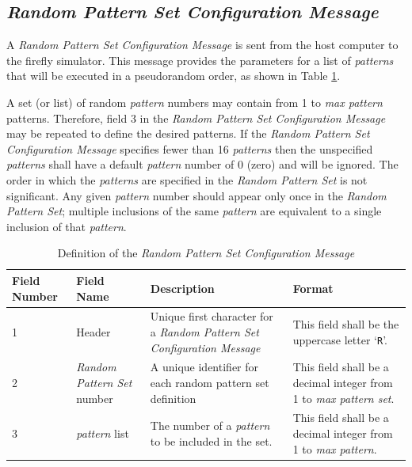 \documentclass[letterpaper,11pt]{article}
\begin{document}
\subsection{\textit{Random Pattern Set Configuration Message}}

A \textit{Random Pattern Set Configuration Message} is sent from the host
computer to the firefly simulator. This message provides the parameters for
a list of \textit{patterns} that will be executed in a pseudorandom order,
as shown in Table \ref{tab:PatternSetConfig}.

A set (or list) of random \textit{pattern} numbers may contain from 1 to
\textit{max pattern} patterns.
Therefore, field 3 in the \textit{Random Pattern Set Configuration Message} may
be repeated to define the desired patterns. If the \textit{Random Pattern Set
Configuration Message} specifies fewer than 16 \textit{patterns} then the
unspecified \textit{patterns} shall have a default \textit{pattern} number of
0 (zero) and will be ignored. The order in which the \textit{patterns} are
specified in the \textit{Random Pattern Set} is not significant. Any given
\textit{pattern} number should appear only once in the \textit{Random Pattern
Set}; multiple inclusions of the same \textit{pattern} are equivalent to a
single inclusion of that \textit{pattern}.

\begin{table}[H]
\centering
\caption{Definition of the \textit{Random Pattern Set Configuration Message}}
\label{tab:PatternSetConfig}
\setlength\extrarowheight{2pt}
\begin{tabular}[h]{|p{0.5in}|p{1.00in}|p{2.25in}|p{2.25in}|} \hline
Field Number & Field Name & Description & Format \\ \hline
1            & Header
             & Unique first character for a \textit{Random Pattern Set
               Configuration Message}
             & This field shall be the uppercase letter `\texttt{R}'.
             \\ \hline
2            & \textit{Random Pattern Set} number
             & A unique identifier for each random pattern set definition
             & This field shall be a decimal integer from 1 to \textit{max
             pattern set}.
             \\ \hline
3            & \textit{pattern} list
             & The number of a \textit{pattern} to be included in the set.
             & This field shall be a decimal integer from 1 to \textit{max
             pattern}.
             \\ \hline
\end{tabular}
\end{table}
\end{document}
